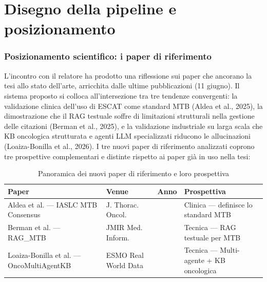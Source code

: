 \documentclass[11pt,a4paper]{article}
\renewcommand{\arraystretch}{1.25}
\begin{document}
\part{Disegno della pipeline e posizionamento}

\section{Posizionamento scientifico: i paper di riferimento}
L'incontro con il relatore ha prodotto una riflessione sui paper che ancorano la tesi allo stato dell'arte, arricchita dalle ultime pubblicazioni (11 giugno). Il sistema proposto si colloca all'intersezione tra tre tendenze convergenti: la validazione clinica dell'uso di ESCAT come standard MTB (Aldea et al., 2025), la dimostrazione che il RAG testuale soffre di limitazioni strutturali nella gestione delle citazioni (Berman et al., 2025), e la validazione industriale su larga scala che KB oncologica strutturata e agenti LLM specializzati riducono le allucinazioni (Loaiza-Bonilla et al., 2026).
I tre nuovi paper di riferimento analizzati coprono tre prospettive complementari e distinte rispetto ai paper già in uso nella tesi:

\begin{table}[htbp]
\centering
\small
\renewcommand{\arraystretch}{1.3}
\caption{Panoramica dei nuovi paper di riferimento e loro prospettiva}
\label{tab:panoramica_nuovi}
\begin{tabularx}{\textwidth}{>{\raggedright\arraybackslash}p{4.5cm} >{\raggedright\arraybackslash}p{3.8cm} >{\centering\arraybackslash}c >{\raggedright\arraybackslash}X}
\toprule
\rowcolor{primary}
\color{white}\textbf{Paper} & \color{white}\textbf{Venue} & \color{white}\textbf{Anno} & \color{white}\textbf{Prospettiva} \\
\midrule
Aldea et al. --- IASLC MTB Consensus & J. Thorac. Oncol. & 2025 & Clinica --- definisce lo standard MTB \\
\rowcolor{roweven}
Berman et al. --- RAG\_MTB & JMIR Med. Inform. & 2025 & Tecnica --- RAG testuale per MTB \\
Loaiza-Bonilla et al. --- OncoMultiAgentKB & ESMO Real World Data & 2026 & Tecnica --- Multi-agente + KB oncologica \\
\bottomrule
\end{tabularx}
\end{table}
\end{document}
